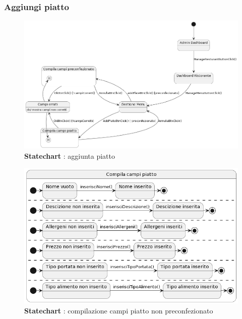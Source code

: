     \subsubsection{Aggiungi piatto}
        \begin{figure}[H]
            \centering
            \includegraphics[scale=0.45]{assets/diagrammi/Statechart/aggiungiPiatto.png}
            \caption*{\textbf{Statechart} : aggiunta piatto}\label{fig:Statechart_AddPlate}
        \end{figure}

        \begin{figure}[H]
            \centering
            \includegraphics[scale=0.6]{assets/diagrammi/Statechart/compilaCampiPiatto.png}
            \caption*{\textbf{Statechart} : compilazione campi piatto non preconfezionato}\label{fig:Statechart_fieldPlate}
        \end{figure}

